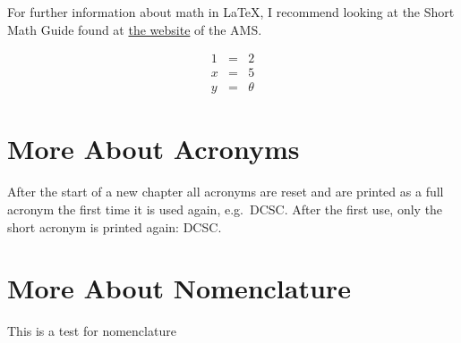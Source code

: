 For further information about math in \LaTeX, I recommend looking at the Short Math Guide found at \href{http://www.ams.org/tex/amslatex.html}{the website} of the \ac{AMS}. 

\begin{eqnarray}
  1 &=& 2\\
  x &=& 5 \\
  y &=& \theta
\end{eqnarray}


\section{More About Acronyms}

After the start of a new chapter all acronyms are reset and are printed as a full acronym the first time it is used again, e.g.\ \ac{DCSC}. After the first use, only the short acronym is printed again: \ac{DCSC}.


\section{More About Nomenclature}

This is a test for nomenclature  
